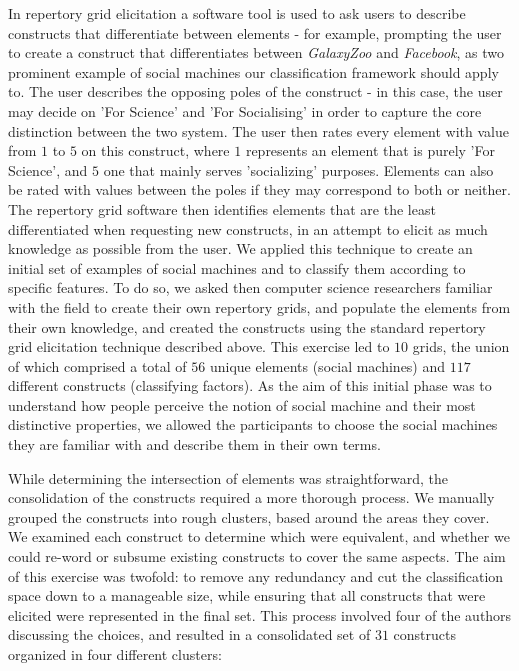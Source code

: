 \documentclass{sig-alternate}
\begin{document}
In repertory grid elicitation a software tool is used to ask users to describe constructs
that differentiate between elements - for example,  prompting the user to create a construct that
differentiates between {\it GalaxyZoo} and {\it Facebook}, as two prominent example of social machines our classification framework should apply to. The user describes the opposing poles of the construct - in this case, the user may decide on 'For Science' and 'For Socialising' in order to capture the core distinction between the two system. The user then rates every element with value from $1$ to $5$ on this construct, where $1$ represents an element that is purely
'For Science', and $5$ one that mainly serves  'socializing' purposes. Elements can also be rated with values between the poles if they may correspond to both or neither. The repertory grid software then identifies elements that are the least differentiated when requesting new constructs, in an attempt to elicit as much knowledge as possible from the user. We applied this technique to create an initial set of examples of social machines and to classify them according to specific features. To do so, we asked then computer science researchers familiar with the field to create their own repertory grids, and populate the elements from their own knowledge, and created the constructs using the standard repertory grid elicitation technique described above. This exercise led to $10$ grids, the union of which comprised a total of $56$ unique elements (social machines)
and $117$ different constructs (classifying factors). As the aim of this initial phase was to understand how people perceive the notion of social machine and their most distinctive properties, we allowed the participants to choose the social machines they are familiar with and describe them in their own terms.


While determining the intersection of elements was straightforward, the consolidation of the
constructs required a more thorough process. We manually grouped the constructs into rough clusters, based around the areas they cover. We examined each construct to determine which were equivalent, and whether we could re-word or subsume existing constructs to cover the same aspects. The aim of this exercise was twofold: to remove any redundancy and cut the classification space down to a manageable size, while ensuring that all constructs that were elicited were represented in the final set. This process involved four of the authors discussing the choices, and resulted in a consolidated set of $31$ constructs organized in four different clusters: 
\end{document}
